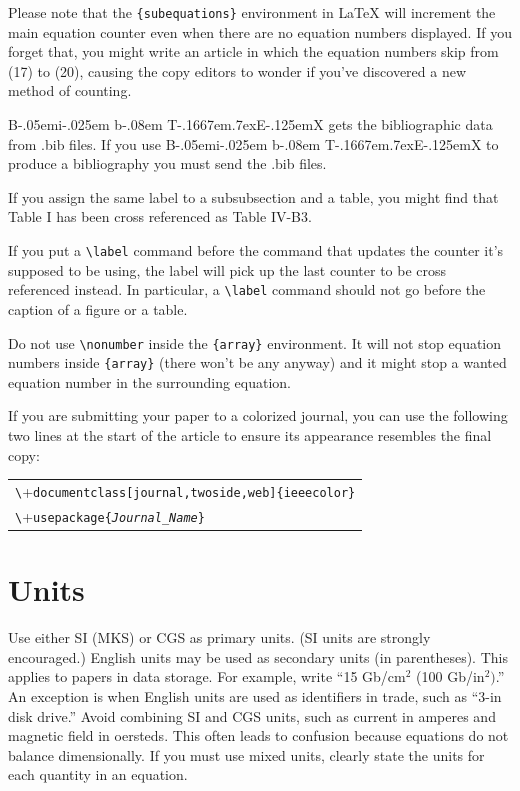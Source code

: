 \documentclass[journal,onecolumn,web]{ieeecolor}
\def\BibTeX{{\rm B\kern-.05em{\sc i\kern-.025em b}\kern-.08em
    T\kern-.1667em\lower.7ex\hbox{E}\kern-.125emX}}
\begin{document}
Please note that the \verb|{subequations}| environment in {\LaTeX}
will increment the main equation counter even when there are no
equation numbers displayed. If you forget that, you might write an
article in which the equation numbers skip from (17) to (20), causing
the copy editors to wonder if you've discovered a new method of
counting.

{\BibTeX} gets the bibliographic
data from .bib files. If you use {\BibTeX} to produce a
bibliography you must send the .bib files. 

If you assign the same label to a
subsubsection and a table, you might find that Table I has been cross
referenced as Table IV-B3. 

If you put a
\verb|\label| command before the command that updates the counter it's
supposed to be using, the label will pick up the last counter to be
cross referenced instead. In particular, a \verb|\label| command
should not go before the caption of a figure or a table.

Do not use \verb|\nonumber| inside the \verb|{array}| environment. It
will not stop equation numbers inside \verb|{array}| (there won't be
any anyway) and it might stop a wanted equation number in the
surrounding equation.

If you are submitting your paper to a colorized journal, you can use
the following two lines at the start of the article to ensure its
appearance resembles the final copy:

\smallskip\noindent
\begin{small}
\begin{tabular}{l}
\verb+\+\texttt{documentclass[journal,twoside,web]\{ieeecolor\}}\\
\verb+\+\texttt{usepackage\{\textit{Journal\_Name}\}}
\end{tabular}
\end{small}

\section{Units}
Use either SI (MKS) or CGS as primary units. (SI units are strongly 
encouraged.) English units may be used as secondary units (in parentheses). 
This applies to papers in data storage. For example, write ``15 
Gb/cm$^{2}$ (100 Gb/in$^{2})$.'' An exception is when 
English units are used as identifiers in trade, such as ``3\textonehalf-in 
disk drive.'' Avoid combining SI and CGS units, such as current in amperes 
and magnetic field in oersteds. This often leads to confusion because 
equations do not balance dimensionally. If you must use mixed units, clearly 
state the units for each quantity in an equation.
\end{document}

